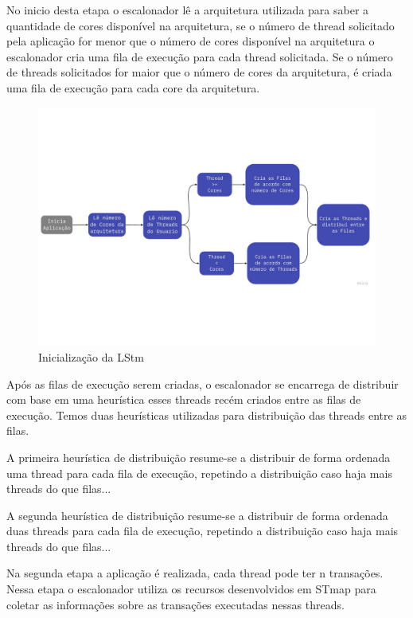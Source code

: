 \documentclass[diss,capa]{texufpel}
\begin{document}
No inicio desta etapa o escalonador lê a arquitetura utilizada para saber a quantidade de cores disponível na arquitetura, se o número de thread solicitado pela aplicação for menor que o número de cores disponível na arquitetura o escalonador cria uma fila de execução para cada thread solicitada. Se o número de threads solicitados for maior que o número de cores da arquitetura, é criada uma fila de execução para cada core da arquitetura.

\begin{figure}[htbp]
  \centering \includegraphics[scale=.5]{images/lstm1}
\caption{Inicialização da LStm} 
\label{LStm1}
\end{figure}

Após as filas de execução serem criadas, o escalonador se encarrega de distribuir com base em uma heurística esses threads recém criados entre as filas de execução. Temos duas heurísticas utilizadas para distribuição das threads entre as filas.

A primeira heurística de distribuição resume-se a distribuir de forma ordenada uma thread para cada fila de execução, repetindo a distribuição caso haja mais threads do que filas...

A segunda heurística de distribuição resume-se a distribuir de forma ordenada duas threads para cada fila de execução, repetindo a distribuição caso haja mais threads do que filas...

Na segunda etapa a aplicação é realizada, cada thread pode ter n transações. Nessa etapa o escalonador utiliza os recursos desenvolvidos em STmap para coletar as informações sobre as transações executadas nessas threads.
\end{document}
